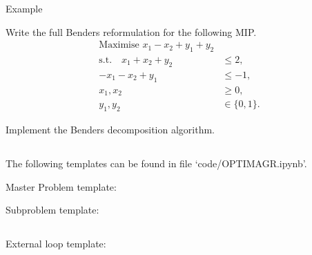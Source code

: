 \begin{bclogo}[logo=\bccrayon]{\small Example }
\vspace{.2cm} \small


Write the full Benders reformulation for the following MIP.
\begin{align*}
\textrm{Maximise }  x_1 - x_2 + y_1 + y_2 & \\
\textrm{s.t.} \quad  x_1  + x_2 + y_2 &\leq 2, \\
 -x_1  - x_2 + y_1 &\leq -1, \\
 x_1, x_2 &\geq 0, \\
 y_1, y_2 &\in \{0,1\}.
\end{align*}

Implement the Benders decomposition algorithm.

\end{bclogo}
\vspace{0.1cm}

\newpage

\subsection*{}

The following templates can be found in file `code/OPTIMAGR.ipynb'.


\begin{bclogo}[logo=\bcinfo]{\small Master Problem template:}
\vspace{.2cm} \tiny

\end{bclogo}



\begin{bclogo}[logo=\bcinfo]{\small Subproblem template:}
\vspace{.2cm} \tiny



\end{bclogo}

\newpage

\subsection*{}


\begin{bclogo}[logo=\bcinfo]{\small External loop template:}
\vspace{.2cm} \tiny




\vspace{.2cm}
\end{bclogo}


